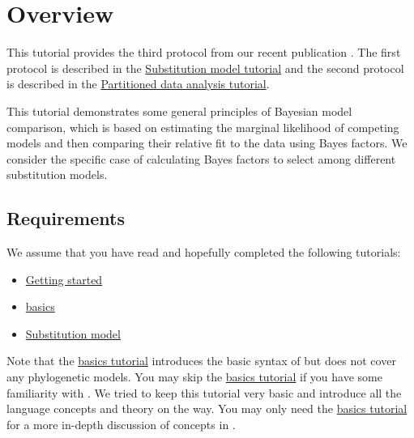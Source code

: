 \section{Overview}

This tutorial provides the third protocol from our recent publication \citep{Hoehna2017a}.
The first protocol is described in the \href{https://github.com/revbayes/revbayes_tutorial/raw/master/tutorial_TeX/RB_CTMC_Tutorial/RB_CTMC_Tutorial.pdf}{Substitution model tutorial} and the second protocol is described in the \href{https://github.com/revbayes/revbayes_tutorial/raw/master/tutorial_TeX/RB_Partition_Tutorial/RB_Partition_Tutorial.pdf}{Partitioned data analysis tutorial}.

This tutorial demonstrates some general principles of Bayesian model comparison, which is based on estimating the marginal likelihood of competing models and then comparing their relative fit to the data using Bayes factors.
We consider the specific case of calculating Bayes factors to select among different substitution models.

\subsection{Requirements}
We assume that you have read and hopefully completed the following tutorials:
\begin{itemize}
\item \href{https://github.com/revbayes/revbayes_tutorial/raw/master/tutorial_TeX/RB_Getting_Started/RB_Getting_Started.pdf}{Getting started}
\item \href{https://github.com/revbayes/revbayes_tutorial/raw/master/tutorial_TeX/RB_Basics_Tutorial/RB_Basics_Tutorial.pdf}{\Rev basics}
\item \href{https://github.com/revbayes/revbayes_tutorial/raw/master/tutorial_TeX/RB_CTMC_Tutorial/RB_CTMC_Tutorial.pdf}{Substitution model}
\end{itemize}
Note that the \href{https://github.com/revbayes/revbayes_tutorial/raw/master/tutorial_TeX/RB_Basics_Tutorial/RB_Basics_Tutorial.pdf}{\Rev basics tutorial} introduces the basic syntax of \Rev but does not cover any phylogenetic models.
You may skip the \href{https://github.com/revbayes/revbayes_tutorial/raw/master/tutorial_TeX/RB_Basics_Tutorial/RB_Basics_Tutorial.pdf}{\Rev basics tutorial} if you have some familiarity with \R.
We tried to keep this tutorial very basic and introduce all the language concepts and theory on the way.
You may only need the \href{https://github.com/revbayes/revbayes_tutorial/raw/master/tutorial_TeX/RB_Basics_Tutorial/RB_Basics_Tutorial.pdf}{\Rev basics tutorial} for a more in-depth discussion of concepts in \Rev.



